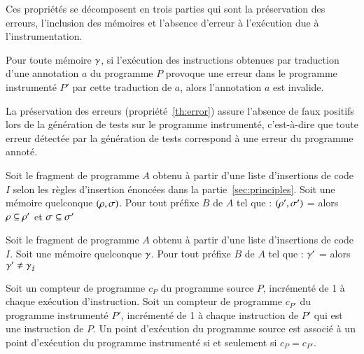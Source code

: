 Ces propriétés se décomposent en trois parties qui sont la préservation des
erreurs, l'inclusion des mémoires et l'absence d'erreur à l'exécution due à
l'instrumentation.

\begin{myproperty}
  \label{th:error}
  Pour toute mémoire $\gamma$, si l'exécution des instructions obtenues
  par traduction d'une annotation $a$
  du programme $P$ provoque une erreur dans le programme instrumenté $P'$ par
  cette traduction de $a$, alors l'annotation $a$ est invalide.
\end{myproperty}

La préservation des erreurs (propriété~\ref{th:error}) assure l'absence de faux
positifs lors de la génération de tests sur le programme instrumenté,
c'est-à-dire que toute erreur détectée par la génération de tests correspond à
une erreur du programme annoté.


\begin{myproperty}
  \label{th:inclusion}
  Soit le fragment de programme $A$ obtenu à partir d'une liste d'insertions de
  code $I$ selon les règles d'insertion énoncées dans la
  partie~\ref{sec:principles}.
  Soit une mémoire quelconque $(\rho, \sigma)$.
  Pour tout préfixe $B$ de $A$ tel que :
  $(\rho', \sigma')$ =  alors
  $\rho \subseteq \rho'$ et $\sigma \subseteq \sigma'$
\end{myproperty}

\begin{myproperty}
  \label{lem:noerror}
  Soit le fragment de programme $A$ obtenu à partir d'une liste d'insertions de
  code $I$.
  Soit une mémoire quelconque $\gamma$.
  Pour tout préfixe $B$ de $A$ tel que :
  $\gamma'$ =  alors
  $\gamma' \neq \gamma_\lightning$
\end{myproperty}

\begin{definition}
  \label{def:exec-point}
  Soit un compteur de programme $c_P$ du programme source $P$, incrémenté de 1 à
  chaque exécution d'instruction.
  Soit un compteur de programme $c_{P'}$ du programme instrumenté $P'$,
  incrémenté de 1 à chaque instruction de $P'$ qui est une instruction de $P$.
  Un point d'exécution du programme source est associé à un point d'exécution du
  programme instrumenté si et seulement si $c_P = c_{P'}$.
\end{definition}

